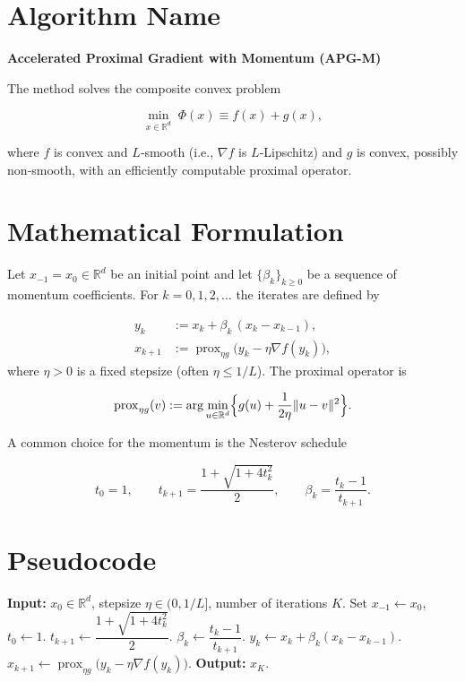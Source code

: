 \documentclass{article}
\newcommand{\prox}{\operatorname{prox}}
\newcommand{\R}{\mathbb{R}}
\begin{document}
\section*{Algorithm Name}
\textbf{Accelerated Proximal Gradient with Momentum (APG-M)}  

The method solves the composite convex problem  

\[
\min_{x\in \R^{d}} \; \Phi(x)\equiv f(x)+g(x),
\]

where $f$ is convex and $L$‑smooth (i.e., $\nabla f$ is $L$‑Lipschitz) and $g$ is convex, possibly non‑smooth, with an efficiently computable proximal operator.

\vspace{0.2cm}
\section*{Mathematical Formulation}
Let $x_{-1}=x_{0}\in\R^{d}$ be an initial point and let $\{\beta_{k}\}_{k\ge 0}$ be a sequence of momentum coefficients.  
For $k=0,1,2,\dots$ the iterates are defined by  

\[
\begin{aligned}
y_{k} &:= x_{k}+ \beta_{k}\,(x_{k}-x_{k-1}), \tag{1}\\[4pt]
x_{k+1} &:= \prox_{\eta g}\!\bigl(y_{k}-\eta \nabla f(y_{k})\bigr), \tag{2}
\end{aligned}
\]
where $\eta>0$ is a fixed stepsize (often $\eta\le 1/L$).  
The proximal operator is  

\[
\prox_{\eta g}(v):=\arg\min_{u\in\R^{d}}\Bigl\{ g(u)+\frac{1}{2\eta}\|u-v\|^{2}\Bigr\}.
\]

A common choice for the momentum is the Nesterov schedule  

\[
t_{0}=1,\qquad
t_{k+1}= \frac{1+\sqrt{1+4t_{k}^{2}}}{2},\qquad
\beta_{k}= \frac{t_{k}-1}{t_{k+1}} .\tag{3}
\]

\vspace{0.2cm}
\section*{Pseudocode}
\begin{algorithm}[H]
\caption{Accelerated Proximal Gradient with Momentum (APG-M)}
\begin{algorithmic}[1]
\State \textbf{Input:} $x_{0}\in\R^{d}$, stepsize $\eta\in(0,1/L]$, number of iterations $K$.
\State Set $x_{-1}\gets x_{0}$, $t_{0}\gets 1$.
    \State $t_{k+1}\gets \dfrac{1+\sqrt{1+4t_{k}^{2}}}{2}$.
    \State $\beta_{k}\gets \dfrac{t_{k}-1}{t_{k+1}}$.
    \State $y_{k}\gets x_{k}+ \beta_{k}(x_{k}-x_{k-1})$.
    \State $x_{k+1}\gets \prox_{\eta g}\!\bigl(y_{k}-\eta \nabla f(y_{k})\bigr)$.
\EndFor
\State \textbf{Output:} $x_{K}$.
\end{algorithmic}
\end{algorithm}
\end{document}
